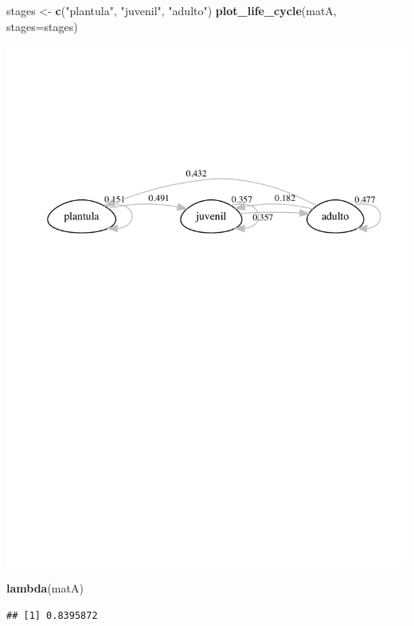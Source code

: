 \documentclass[
]{book}
\newenvironment{Shaded}{\begin{snugshade}}{\end{snugshade}}
\newcommand{\AttributeTok}[1]{\textcolor[rgb]{0.13,0.29,0.53}{#1}}
\newcommand{\FunctionTok}[1]{\textcolor[rgb]{0.13,0.29,0.53}{\textbf{#1}}}
\newcommand{\NormalTok}[1]{#1}
\newcommand{\OtherTok}[1]{\textcolor[rgb]{0.56,0.35,0.01}{#1}}
\newcommand{\StringTok}[1]{\textcolor[rgb]{0.31,0.60,0.02}{#1}}
\theoremstyle{definition}
\theoremstyle{definition}
\theoremstyle{definition}
\theoremstyle{definition}
\theoremstyle{remark}
\begin{document}
\begin{Shaded}
\begin{Highlighting}[]
\NormalTok{stages }\OtherTok{\textless{}{-}} \FunctionTok{c}\NormalTok{(}\StringTok{"plantula"}\NormalTok{, }\StringTok{"juvenil"}\NormalTok{, }\StringTok{"adulto"}\NormalTok{)}
\FunctionTok{plot\_life\_cycle}\NormalTok{(matA, }\AttributeTok{stages=}\NormalTok{stages)}
\end{Highlighting}
\end{Shaded}

\includegraphics{Diagnostico_Poblacional_files/figure-latex/unnamed-chunk-66-1.pdf}

\begin{Shaded}
\begin{Highlighting}[]
\FunctionTok{lambda}\NormalTok{(matA)}
\end{Highlighting}
\end{Shaded}

\begin{verbatim}
## [1] 0.8395872
\end{verbatim}
\end{document}
